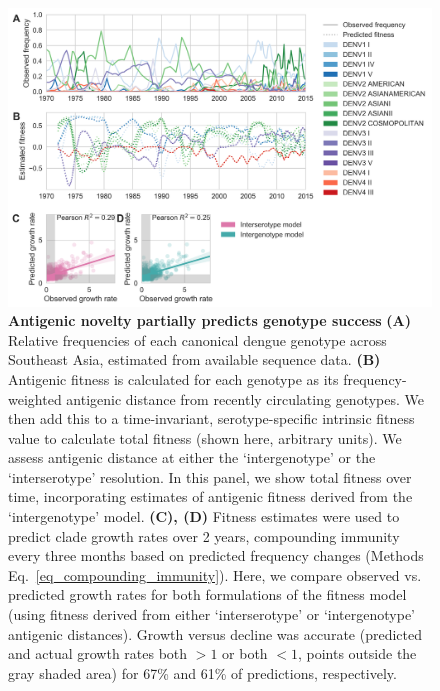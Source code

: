 \documentclass[11pt,oneside,letterpaper]{article}
\begin{document}
\begin{figure}[ht]
  \begin{centering}
\includegraphics[width=\linewidth]{../figures/png/genotype-fitness.png}
    \caption{\textbf{Antigenic novelty partially predicts genotype success }
    \textbf{(A)} Relative frequencies of each canonical dengue genotype across Southeast Asia, estimated from available sequence data.
    \textbf{(B)} Antigenic fitness is calculated for each genotype as its frequency-weighted antigenic distance from recently circulating genotypes.
    We then add this to a time-invariant, serotype-specific intrinsic fitness value to calculate total fitness (shown here, arbitrary units).
    We assess antigenic distance at either the `intergenotype' or the `interserotype' resolution.
    In this panel, we show total fitness over time, incorporating estimates of antigenic fitness derived from the `intergenotype' model.
    \textbf{(C), (D)}  Fitness estimates were used to predict clade growth rates over 2 years, compounding immunity every three months based on predicted frequency changes (Methods Eq.~\ref{eq_compounding_immunity}).
    Here, we compare observed vs. predicted growth rates for both formulations of the fitness model (using fitness derived from either `interserotype' or `intergenotype' antigenic distances).
    Growth versus decline was accurate (predicted and actual growth rates both $> 1$ or both $< 1$, points outside the gray shaded area) for 67\% and 61\% of predictions, respectively.
}
     \label{genotype_fitness}
   \end{centering}
\end{figure}

\pagebreak
\end{document}
